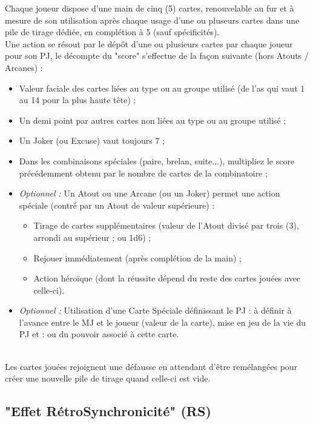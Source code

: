 \documentclass[11pt,twoside,a5paper]{book}
\begin{document}
Chaque joueur dispose d'une main de cinq (5) cartes, renouvelable au fur et {\`a} mesure de son utilisation apr{\`e}s chaque usage d'une ou pluseurs cartes dans une pile de tirage d{\'e}di{\'e}e, en compl{\'e}tion {\`a} 5 (sauf sp{\'e}cificit{\'e}s).~\\
Une action se r{\'e}sout par le d{\'e}p{\^o}t d'une ou plusieurs cartes par chaque joueur pour son PJ, le d{\'e}compte du "score" s'effectue de la fa\c{c}on suivante (hors Atouts / Arcanes) : 
\begin{itemize}
	\item Valeur faciale des cartes li{\'e}es au type ou au groupe utilis{\'e} (de l'as qui vaut 1 au 14 pour la plus haute t{\^e}te) ; 
	\item Un demi point par autres cartes non li{\'e}es au type ou au groupe utilis{\'e} ; 
	\item Un Joker (ou Excuse) vaut toujours 7 ; 
	\item Dans les combinaisons sp{\'e}ciales (paire, brelan, suite...), multipliez le score pr{\'e}c{\'e}demment obtenu par le nombre de cartes de la combinatoire ; 
	\item \emph{Optionnel : }Un Atout ou une Arcane (ou un Joker) permet une action sp{\'e}ciale (contr{\'e} par un Atout de valeur sup{\'e}rieure) : 
	\begin{itemize}
		\item Tirage de cartes suppl{\'e}mentaires (valeur de l'Atout divis{\'e} par trois (3), arrondi au sup{\'e}rieur ; ou 1d6) ; 
		\item Rejouer imm{\'e}diatement (apr{\`e}s compl{\'e}tion de la main) ; 
		\item Action h{\'e}ro{\"i}que (dont la r{\'e}ussite d{\'e}pend du reste des cartes jou{\'e}es avec celle-ci). 
	\end{itemize}
	\item \emph{Optionnel : }Utilisation d'une Carte Sp{\'e}ciale d{\'e}finissant le PJ : {\`a} d{\'e}finir {\`a} l'avance entre le MJ et le joueur (valeur de la carte), mise en jeu de la vie du PJ et : ou du pouvoir associ{\'e} {\`a} cette carte. 
\end{itemize}~\\

Les cartes jou{\'e}es rejoignent une d{\'e}fausse en attendant d'{\^e}tre rem{\'e}lang{\'e}es pour cr{\'e}er une nouvelle pile de tirage quand celle-ci est vide. %

\subsection{"Effet R{\'e}troSynchronicit{\'e}" (RS)} 
\end{document}

